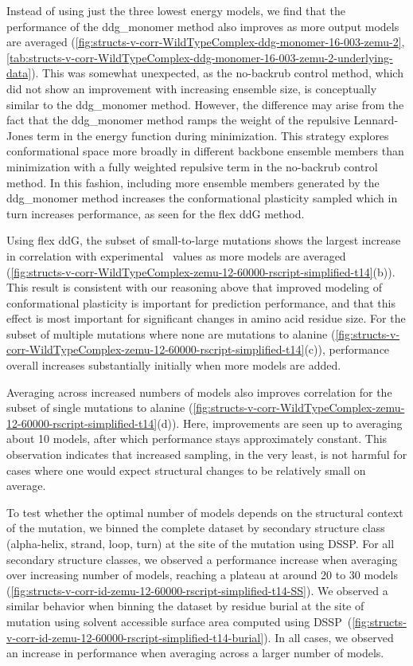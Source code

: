 Instead of using just the three lowest energy models\cite{kellogg_role_2011}, we find that the performance of the ddg\_monomer method also improves as more output models are averaged (\cref{fig:structs-v-corr-WildTypeComplex-ddg-monomer-16-003-zemu-2}, \cref{tab:structs-v-corr-WildTypeComplex-ddg-monomer-16-003-zemu-2-underlying-data}).
This was somewhat unexpected, as the no-backrub control method, which did not show an improvement with increasing ensemble size, is conceptually similar to the ddg\_monomer method. However, the difference may arise from the fact that the ddg\_monomer method ramps the weight of the repulsive Lennard-Jones term in the energy function during minimization. This strategy explores conformational space more broadly in different backbone ensemble members than minimization with a fully weighted repulsive term in the no-backrub control method. In this fashion, including more ensemble members generated by the ddg\_monomer method increases the conformational plasticity sampled which in turn increases performance, as seen for the flex ddG method.

Using flex ddG, the subset of small-to-large mutations shows the largest increase in correlation with experimental \ddg\ values as more models are averaged (\cref{fig:structs-v-corr-WildTypeComplex-zemu-12-60000-rscript-simplified-t14}(b)). This result is consistent with our reasoning above that improved modeling of conformational plasticity is important for prediction performance, and that this effect is most important for significant changes in amino acid residue size. For the subset of multiple mutations where none are mutations to alanine (\cref{fig:structs-v-corr-WildTypeComplex-zemu-12-60000-rscript-simplified-t14}(c)), performance overall increases substantially initially when more models are added.

Averaging across increased numbers of models also improves correlation for the subset of single mutations to alanine (\cref{fig:structs-v-corr-WildTypeComplex-zemu-12-60000-rscript-simplified-t14}(d)).
Here, improvements are seen up to averaging about 10 models, after which performance stays approximately constant.
This observation indicates that increased sampling, in the very least, is not harmful for cases where one would expect structural changes to be relatively small on average.

To test whether the optimal number of models depends on the structural context of the mutation, we binned the complete dataset by secondary structure class (alpha-helix, strand, loop, turn) at the site of the mutation using DSSP\cite{kabsch_dictionary_1983,joosten_series_2011}. For all secondary structure classes, we observed a performance increase when averaging over increasing number of models, reaching a plateau at around 20 to 30 models (\cref{fig:structs-v-corr-id-zemu-12-60000-rscript-simplified-t14-SS}). We observed a similar behavior when binning the dataset by residue burial at the site of mutation using solvent accessible surface area computed using DSSP\cite{kabsch_dictionary_1983,joosten_series_2011}\ (\cref{fig:structs-v-corr-id-zemu-12-60000-rscript-simplified-t14-burial}). In all cases, we observed an increase in performance when averaging across a larger number of models.

